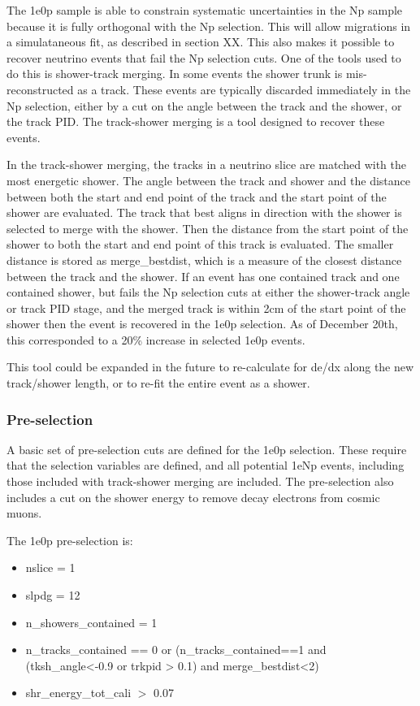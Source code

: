 \documentclass[a4paper]{article}
\begin{document}
The 1e0p sample is able to constrain systematic uncertainties in the Np sample because it is fully orthogonal with the Np selection.  This will allow migrations in a simulataneous fit, as described in section XX.  This also makes it possible to recover neutrino events that fail the Np selection cuts.  One of the tools used to do this is shower-track merging.  In some events the shower trunk is mis-reconstructed as a track.  These events are typically discarded immediately in the Np selection, either by a cut on the angle between the track and the shower, or the track PID.  The track-shower merging is a tool designed to recover these events.

In the track-shower merging, the tracks in a neutrino slice are matched with the most energetic shower.  The angle between the track and shower and the distance between both the start and end point of the track and the start point of the shower are evaluated.  The track that best aligns in direction with the shower is selected to merge with the shower.  Then the distance from the start point of the shower to both the start and end point of this track is evaluated.  The smaller distance is stored as merge\_bestdist, which is a measure of the closest distance between the track and the shower. If an event has one contained track and one contained shower, but fails the Np selection cuts at either the shower-track angle or track PID stage, and the merged track is within 2cm of the start point of the shower then the event is recovered in the 1e0p selection.  As of December 20th, this corresponded to a 20\% increase in selected 1e0p events.

This tool could be expanded in the future to re-calculate for de/dx along the new track/shower length, or to re-fit the entire event as a shower.

\subsubsection{Pre-selection}
A basic set of pre-selection cuts are defined for the 1e0p selection.  These require that the selection variables are defined, and all potential 1eNp events, including those included with track-shower merging are included.  The pre-selection also includes a cut on the shower energy to remove decay electrons from cosmic muons.

The 1e0p pre-selection is:
\begin{itemize}
    \item nslice = 1
    \item slpdg = 12
    \item n\_showers\_contained = 1
    \item n\_tracks\_contained == 0 or (n\_tracks\_contained==1 and (tksh\_angle<-0.9 or trkpid > 0.1) and merge\_bestdist<2)
    \item shr\_energy\_tot\_cali $>$ 0.07
\end{itemize}
\end{document}
